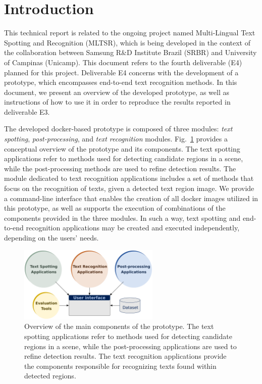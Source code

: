 \section{Introduction}
\label{sec:introduction}

This technical report is related to the ongoing project named Multi-Lingual Text Spotting and Recognition (MLTSR), which is being developed in the context of the collaboration between Samsung R\&D Institute Brazil (SRBR) and University of Campinas (Unicamp). This document refers to the fourth deliverable (E4) planned for this project. Deliverable E4 concerns with the development of a prototype, which encompasses end-to-end text recognition methods. In this document, we present an overview of the developed prototype, as well as instructions of how to use it in order to reproduce the results reported in deliverable E3.

The developed docker-based prototype is composed of three modules: \textit{text spotting}, \textit{post-processing}, and \textit{text recognition} modules. Fig.~\ref{fig:prototype-overview-simple} provides a conceptual overview of the prototype and its components. The text spotting applications refer to methods used for detecting candidate regions in a scene, while the post-processing methods are used to refine detection results. The module dedicated to text recognition applications includes a set of methods that focus on the recognition of texts, given a detected text region image. We provide a command-line interface that enables the creation of all docker images utilized in this prototype, as well as supports the execution of combinations of the components provided in the three modules. In such a way, text spotting and end-to-end recognition applications may be created and executed independently, depending on the users' needs.
%
\begin{figure}
    \centering
    \includegraphics[width=0.6\textwidth]{figs/prototype-overview-simple.pdf}
    \caption{Overview of the main components of the prototype. The text spotting applications refer to methods used for detecting candidate regions in a scene, while the post-processing applications are used to refine detection results. The text recognition applications provide the components responsible for recognizing texts found within detected regions.}
    \label{fig:prototype-overview-simple}
\end{figure}

